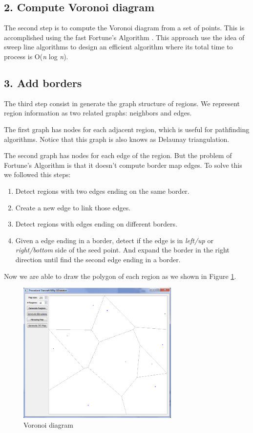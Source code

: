 \documentclass[letterpaper]{article}
\begin{document}
\subsection{2. Compute Voronoi diagram}
The second step is to compute the Voronoi diagram from a set of points. This is accomplished using the fast Fortune's Algorithm \cite{Fortune}. This approach use the idea of sweep line algorithms to design an efficient algorithm where its total time to process is O(\emph{n} log \emph{n}).

\subsection{3. Add borders}
The third step consist in generate the graph structure of regions. We represent region information as two related graphs: neighbors and edges.

The first graph has nodes for each adjacent region, which is useful for pathfinding algorithms. Notice that this graph is also knows as Delaunay triangulation.

The second graph has nodes for each edge of the region. But the problem of Fortune's Algorithm is that it doesn't compute border map edges. To solve this we followed this steps:
\begin{enumerate}
	\item Detect regions with two edges ending on the same border.
	\item Create a new edge to link those edges.
	\item Detect regions with edges ending on different borders.
	\item Given a edge ending in a border, detect if the edge is in \emph{left/up} or \emph{right/bottom} side of the seed point. And expand the border in the right direction until find the second edge ending in a border.
\end{enumerate}
Now we are able to draw the polygon of each region as we shown in Figure \ref{fig:voronoi-diagram}.

\begin{figure}[ht]
    \centering
    \includegraphics[width=8cm]{PCG02.png}
    \caption{Voronoi diagram}
    \label{fig:voronoi-diagram}
\end{figure}
\end{document}
